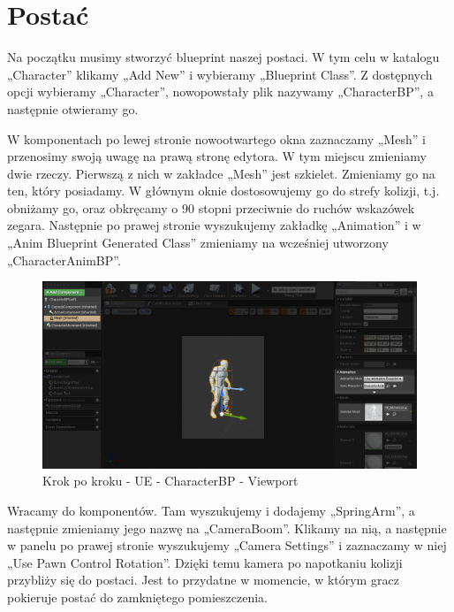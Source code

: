 \documentclass[12pt]{xmgr}
\begin{document}
\newpage
\section{Postać}

Na początku musimy stworzyć blueprint naszej postaci. W tym celu w katalogu „Character” klikamy „Add New” i wybieramy „Blueprint Class”. Z dostępnych opcji wybieramy „Character”, nowopowstały plik nazywamy „CharacterBP”, a następnie otwieramy go.

W komponentach po lewej stronie nowootwartego okna zaznaczamy „Mesh” i przenosimy swoją uwagę na prawą stronę edytora. W tym miejscu zmieniamy dwie rzeczy. Pierwszą z nich w zakładce „Mesh” jest szkielet. Zmieniamy go na ten, który posiadamy. W głównym oknie dostosowujemy go do strefy kolizji, t.j. obniżamy go, oraz obkręcamy o 90 stopni przeciwnie do ruchów wskazówek zegara. Następnie po prawej stronie wyszukujemy zakładkę „Animation” i w „Anim Blueprint Generated Class” zmieniamy na wcześniej utworzony „CharacterAnimBP”.

\begin{figure}[!htb]
    \begin{center}
    \includegraphics[scale=0.35]{Screeny/UeKrokPoKroku/UE-CharacterBP-Viewport.png}
    \end{center}
    \caption{Krok po kroku - UE -  CharacterBP - Viewport}
\end{figure}


Wracamy do komponentów. Tam wyszukujemy i dodajemy „SpringArm”, a następnie zmieniamy jego nazwę na „CameraBoom”. Klikamy na nią, a następnie w panelu po prawej stronie wyszukujemy „Camera Settings” i zaznaczamy w niej „Use Pawn Control Rotation”. Dzięki temu kamera po napotkaniu kolizji przybliży się do postaci. Jest to przydatne w momencie, w którym gracz pokieruje postać do zamkniętego pomieszczenia. 
\end{document}
